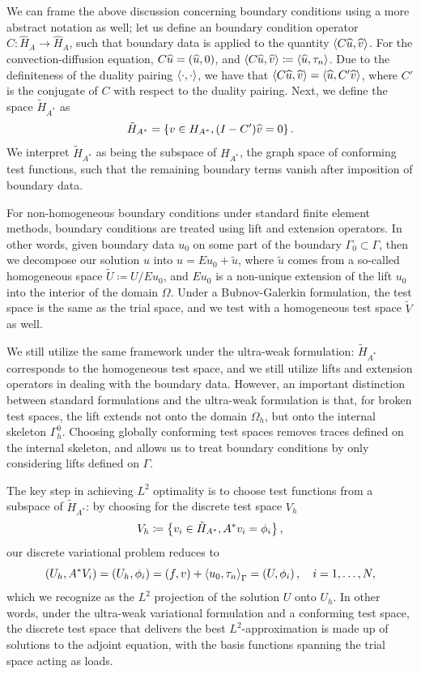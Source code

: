 We can frame the above discussion concerning boundary conditions using a more abstract notation as well; let us define an boundary condition operator $C:\widehat{H}_{A} \rightarrow \widehat{H}_{A}$, such that boundary data is applied to the quantity $\LRa{C\widehat{u},\widehat{v}}$.  For the convection-diffusion equation, $C\widehat{u} = \LRp{\uh,0}$, and $\LRa{C\widehat{u},\widehat{v}} \coloneqq \LRa{\uh,\tau_n}$.  Due to the definiteness of the duality pairing $\LRa{\cdot,\cdot}$, we have that $\LRa{C\widehat{u},\widehat{v}} = \LRa{\widehat{u},C'\widehat{v}}$, where $C'$ is the conjugate of $C$ with respect to the duality pairing.  Next, we define the space $\tilde{H}_{A^*}$ as
\[
\tilde{H}_{A^*} = \LRc{v\in H_{A^*}, (I-C')\widehat{v} = 0}.
\]
We interpret $\tilde{H}_{A^*}$ as being the subspace of $H_{A^*}$, the graph space of conforming test functions, such that the remaining boundary terms vanish after imposition of boundary data.  

\begin{remark}
For non-homogeneous boundary conditions under standard finite element methods, boundary conditions are treated using lift and extension operators.  In other words, given boundary data $u_0$ on some part of the boundary $\Gamma_0 \subset \Gamma$, then we decompose our solution $u$ into $u = E u_0 + \tilde{u}$, where $\tilde{u}$ comes from a so-called homogeneous space $\tilde{{U}} \coloneqq {U}/Eu_0$, and $Eu_0$ is a non-unique extension of the lift $u_0$ into the interior of the domain $\Omega$.  Under a Bubnov-Galerkin formulation, the test space is the same as the trial space, and we test with a homogeneous test space $\tilde{{V}}$ as well.  

We still utilize the same framework under the ultra-weak formulation: $\tilde{H}_{A^*}$ corresponds to the homogeneous test space, and we still utilize lifts and extension operators in dealing with the boundary data.  However, an important distinction between standard formulations and the ultra-weak formulation is that, for broken test spaces, the lift extends not onto the domain $\Omega_h$, but onto the internal skeleton $\Gamma_h^0$.  Choosing globally conforming test spaces removes traces defined on the internal skeleton, and allows us to treat boundary conditions by only considering lifts defined on $\Gamma$.
\end{remark} 

The key step in achieving $L^2$ optimality is to choose test functions from a subspace of $\tilde{H}_{A^*}$: by choosing for the discrete test space $V_h$
\[
V_h \coloneqq \LRc{v_i\in \tilde{H}_{A^*}, A^*v_i = \phi_i},
\]
our discrete variational problem reduces to 
\[
\LRp{U_h,A^*V_i} = \LRp{U_h,\phi_i} = \LRp{f,v} + \LRa{u_0,\tau_n}_{\Gamma} = \LRp{U,\phi_i}, \quad i = 1,\ldots,N,
\]
which we recognize as the $L^2$ projection of the solution $U$ onto ${U}_h$.  In other words, under the ultra-weak variational formulation and a conforming test space, the discrete test space that delivers the best $L^2$-approximation is made up of solutions to the adjoint equation, with the basis functions spanning the trial space acting as loads.  

